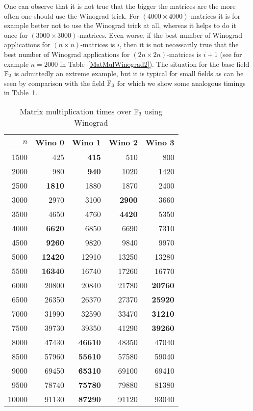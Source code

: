 One can observe that it is not true that the bigger the matrices are
the more often one should use the Winograd trick. For $(4000 \times
4000)$-matrices it is for example better not to use the Winograd trick
at all, whereas it helps to do it once for $(3000 \times
3000)$-matrices. Even worse, if the best number of
Winograd applications for $(n \times n)$-matrices is $i$, then it 
is not necessarily true that the best number of Winograd applications
for $(2n \times 2n)$-matrices is $i+1$ (see for example $n=2000$ in 
Table~\ref{MatMulWinograd2}). The situation for the base field 
$\mathbb{F}_2$ is admittedly an extreme example, but it is typical for small
fields as can be seen by comparison with the field $\mathbb{F}_3$ for which we
show some analogous timings in Table~\ref{MatMulWinograd3}.

\begin{table}[ht]
\begin{center}
\begin{tabular}{|r||r|r|r|r|}
\hline
$n$ & Wino 0 & Wino 1 & Wino 2 & Wino 3 \\
\hline
1500 & 425 & \textbf{415} & 510 & 800\\
2000 & 980 & \textbf{940} & 1020 & 1420\\
2500 & \textbf{1810} & 1880 & 1870 & 2400\\
3000 & 2970 & 3100 & \textbf{2900} & 3660\\
3500 & 4650 & 4760 & \textbf{4420} & 5350\\
4000 & \textbf{6620} & 6850 & 6690 & 7310\\
4500 & \textbf{9260} & 9820 & 9840 & 9970\\
5000 & \textbf{12420} & 12910 & 13250 & 13280\\
5500 & \textbf{16340} & 16740 & 17260 & 16770\\
6000 & 20800 & 20840 & 21780 & \textbf{20760}\\
6500 & 26350 & 26370 & 27370 & \textbf{25920}\\
7000 & 31990 & 32590 & 33470 & \textbf{31210}\\
7500 & 39730 & 39350 & 41290 & \textbf{39260}\\
8000 & 47430 & \textbf{46610} & 48350 & 47040\\
8500 & 57960 & \textbf{55610} & 57580 & 59040\\
9000 & 69450 & \textbf{65310} & 69100 & 69410\\
9500 & 78740 & \textbf{75780} & 79880 & 81380\\
10000 & 91130 & \textbf{87290} & 91120 & 93040\\
\hline
\end{tabular}
\end{center}
\caption{Matrix multiplication times over $\mathbb{F}_3$ using Winograd}
\label{MatMulWinograd3}
%
\end{table}


